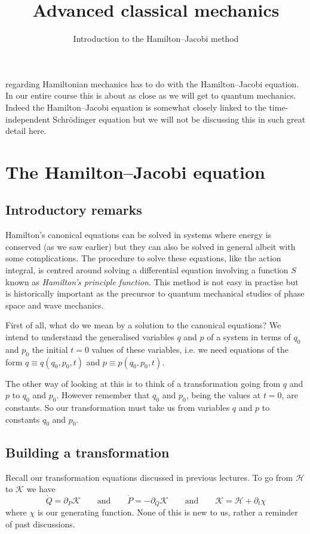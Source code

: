\documentclass[english,seminar,headertitle]{lecture}
\title{Advanced classical mechanics}
\subtitle{Introduction to the Hamilton--Jacobi method}
\author{}
\date{}{}{}
\newcommand{\ham}{\mathscr{H}}
\newcommand{\kam}{\mathscr{K}}
\begin{document}
	
\noindent{} regarding Hamiltonian mechanics has to do with the Hamilton--Jacobi equation. In our entire course this is about as close as we will get to quantum mechanics. Indeed the Hamilton--Jacobi equation is somewhat closely linked to the time-independent Schr\"{o}dinger equation \cite{hamil} but we will not be discussing this in such great detail here.

\section{The Hamilton--Jacobi equation}

\subsection{Introductory remarks}

Hamilton's canonical equations can be solved in systems where energy is conserved (as we saw earlier) but they can also be solved in general albeit with some complications. The procedure to solve these equations, like the action integral, is centred around solving a differential equation involving a function $S$ known as \textit{Hamilton's principle function}. This method is not easy in practise but is historically important as the precursor to quantum mechanical studies of phase space and wave mechanics.

First of all, what do we mean by a solution to the canonical equations? We intend to understand the generalised variables $q$ and $p$ of a system in terms of $q_0$ and $p_0$ the initial $t=0$ values of these variables, i.e. we need equations of the form $q \equiv q(q_0,p_0,t)$ and $p \equiv p(q_0,p_0,t)$.

The other way of looking at this is to think of a transformation going from $q$ and $p$ to $q_0$ and $p_0$. However remember that $q_0$ and $p_0$, being the values at $t=0$, are constants. So our transformation must take us from variables $q$ and $p$ to constants $q_0$ and $p_0$.

\subsection{Building a transformation}

Recall our transformation equations discussed in previous lectures. To go from $\ham$ to $\kam$ we have $$\dot{Q} = \partial_P \kam \qquad\textrm{and}\qquad \dot{P} = - \partial_Q \kam \qquad\textrm{and}\qquad \kam = \ham + \partial_t \chi$$where $\chi$ is our generating function. None of this is new to us, rather a reminder of past discussions.
\end{document}

